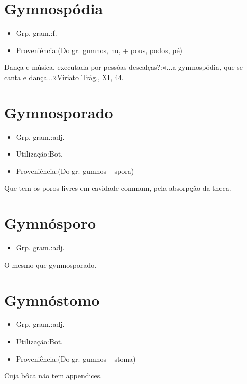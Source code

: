 \section{Gymnospódia}
\begin{itemize}
\item {Grp. gram.:f.}
\end{itemize}
\begin{itemize}
\item {Proveniência:(Do gr. \textunderscore gumnos\textunderscore , nu, + \textunderscore pous\textunderscore , \textunderscore podos\textunderscore , pé)}
\end{itemize}
Dança e música, executada por pessôas descalças?:«\textunderscore ...a gymnospódia, que se canta e dança...\textunderscore »\textunderscore Viriato Trág.\textunderscore , XI, 44.
\section{Gymnosporado}
\begin{itemize}
\item {Grp. gram.:adj.}
\end{itemize}
\begin{itemize}
\item {Utilização:Bot.}
\end{itemize}
\begin{itemize}
\item {Proveniência:(Do gr. \textunderscore gumnos\textunderscore  + \textunderscore spora\textunderscore )}
\end{itemize}
Que tem os poros livres em cavidade commum, pela absorpção da theca.
\section{Gymnósporo}
\begin{itemize}
\item {Grp. gram.:adj.}
\end{itemize}
O mesmo que \textunderscore gymnosporado\textunderscore .
\section{Gymnóstomo}
\begin{itemize}
\item {Grp. gram.:adj.}
\end{itemize}
\begin{itemize}
\item {Utilização:Bot.}
\end{itemize}
\begin{itemize}
\item {Proveniência:(Do gr. \textunderscore gumnos\textunderscore  + \textunderscore stoma\textunderscore )}
\end{itemize}
Cuja bôca não tem appendices.
